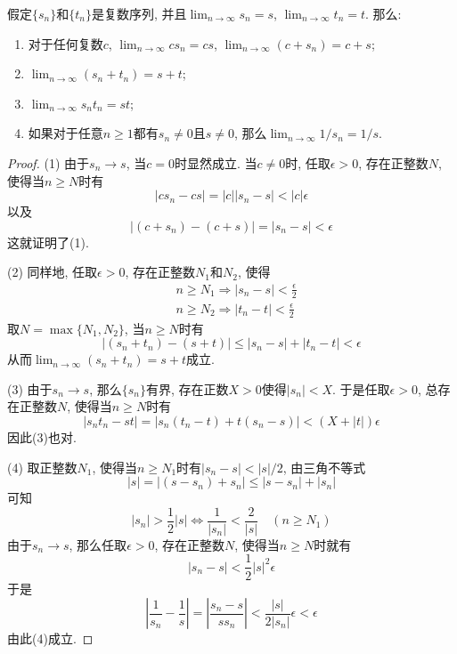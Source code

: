 \documentclass[cn,12pt,math=mtpro2,citestyle=gb7714-2015,bibstyle=gb7714-2015,twocol]{elegantbook}
\newcommand{\limn}{\lim_{n\to\infty}}
\begin{document}
  \begin{theorem}\label{thm:th3.1}
    假定$\{s_n\}$和$\{t_n\}$是复数序列, 并且$\limn  s_n=s$, $\limn  t_n=t$. 那么:
    \begin{enumerate}[label=(\arabic*)]
    \item 对于任何复数$c$, $\limn  cs_n=cs$, $\limn (c+s_n)=c+s$;

    \item $\limn (s_n+t_n)=s+t$;

    \item $\limn  s_nt_n=st$;

    \item 如果对于任意$n\ge1$都有$s_n\neq 0$且$s\neq0$, 那么$\limn 1/s_n=1/s$.
    \end{enumerate}
  \end{theorem}
  \begin{proof}
    (1) 由于$s_n\rightarrow s$, 当$c=0$时显然成立. 当$c\neq 0$时, 任取$\epsilon>0$, 存在正整数$N$, 使得当$n\geq N$时有
    $$|cs_n-cs|=|c||s_n-s|<|c|\epsilon$$
    以及
    $$|(c+s_n)-(c+s)|=|s_n-s|<\epsilon$$
    这就证明了(1).

    (2) 同样地, 任取$\epsilon>0$, 存在正整数$N_1$和$N_2$, 使得
    \begin{align*}
    &n\geq N_1\Rightarrow |s_n-s|<\frac{\epsilon}{2} \\
    &n\geq N_2\Rightarrow |t_n-t|<\frac{\epsilon}{2}
    \end{align*}
    取$N=\max\{N_1,N_2\}$, 当$n\geq N$时有
    $$|(s_n+t_n)-(s+t)|\leq |s_n-s|+|t_n-t|<\epsilon$$
    从而$\displaystyle\limn (s_n+t_n)=s+t$成立.

    (3) 由于$s_n\rightarrow s$, 那么$\{s_n\}$有界, 存在正数$X>0$使得$|s_n|<X$. 于是任取$\epsilon>0$, 总存在正整数$N$, 使得当$n\geq N$时有
    $$|s_nt_n-st|=|s_n(t_n-t)+t(s_n-s)|<(X+|t|)\epsilon$$
    因此(3)也对.

    (4) 取正整数$N_1$, 使得当$n\geq N_1$时有$|s_n-s|<|s|/2$, 由三角不等式
    $$|s|=|(s-s_n)+s_n|\leq |s-s_n|+|s_n|$$
    可知
    $$|s_n|>\frac{1}{2}|s|\Leftrightarrow\frac{1}{|s_n|}<\frac{2}{|s|}\quad(n\geq N_1)$$
    由于$s_n\rightarrow s$, 那么任取$\epsilon>0$, 存在正整数$N$, 使得当$n\geq N$时就有
    $$|s_n-s|<\frac{1}{2}|s|^2\epsilon$$
    于是
    $$\left|\frac{1}{s_n}-\frac{1}{s}\right|=\left|\frac{s_n-s}{ss_n}\right|<\frac{|s|}{2|s_n|}\epsilon<\epsilon$$
    由此(4)成立.
  \end{proof}
\end{document}
